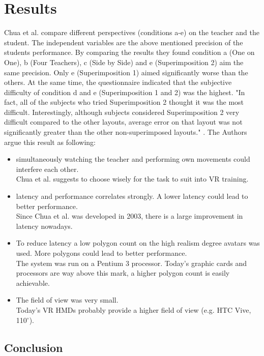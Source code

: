 \section{Results}
Chua et al. compare different perspectives (conditions a-e) on the teacher and the student. The independent variables are the above mentioned precision of the students performance. By comparing the results they found condition a (One on One), b (Four Teachers), c (Side by Side) and e (Superimposition 2) aim the same precision. Only e (Superimposition 1) aimed significantly worse than the others. At the same time, the questionnaire indicated that the subjective difficulty of condition d and e (Superimposition 1 and 2) was the highest. "In fact, all of the subjects who tried Superimposition 2 thought it was the most difficult. Interestingly, although subjects considered Superimposition 2 very difficult compared to the other layouts, average error on that layout was not significantly greater than the other non-superimposed layouts." \cite{Chua}. The Authors argue this result as following:
\begin{itemize}
	\item simultaneously watching the teacher and performing own movements could interfere each other.\\
	Chua et al. suggests to choose wisely for the task to suit into VR training.
	\item latency and performance correlates strongly. A lower latency could lead to better performance.\\
	Since Chua et al. \cite{Chua} was developed in 2003, there is a large improvement in latency nowadays.
	\item To reduce latency a low polygon count on the high realism degree avatars was used. More polygons could lead to better performance.\\
	The system was run on a Pentium 3 processor. Today's graphic cards and processors are way above this mark, a higher polygon count is easily achievable.
	\item The field of view was very small.\\
	Today's VR HMDs probably provide a higher field of view (e.g. HTC Vive, 110$^\circ$).
\end{itemize}
\subsection{Conclusion}



